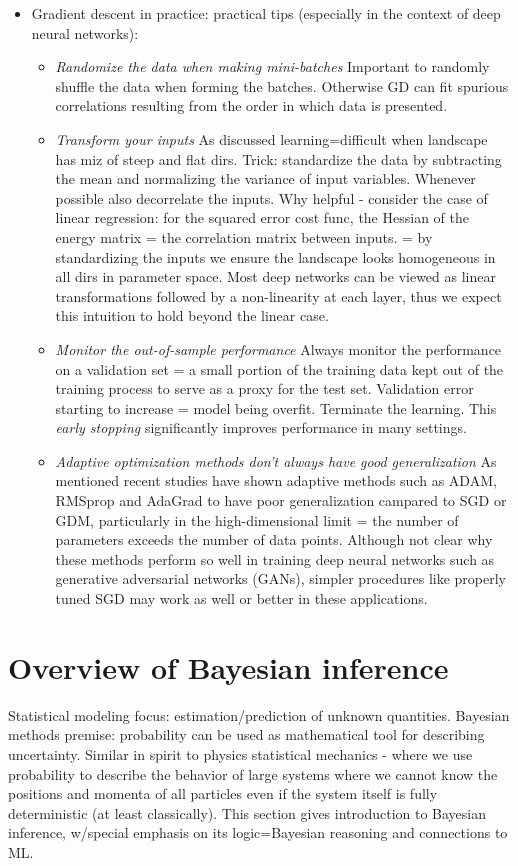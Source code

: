 \documentclass[norsk,a4paper,11pt]{article}
\begin{document}
\begin{itemize}
		\item Gradient descent in practice: practical tips (especially in the context of deep neural networks):
		\begin{itemize}
			\item \textit{Randomize the data when making mini-batches}
			Important to randomly shuffle the data when forming the batches. Otherwise GD can fit spurious correlations resulting from the order in which data is presented.
			\item \textit{Transform your inputs}
			As discussed learning=difficult when landscape has miz of steep and flat dirs. Trick: standardize the data by subtracting the mean and normalizing the variance of input variables. Whenever possible also decorrelate the inputs. Why helpful - consider the case of linear regression: for the squared error cost func, the Hessian of the energy matrix = the correlation matrix between inputs. = by standardizing the inputs we ensure the landscape looks homogeneous in all dirs in parameter space. Most deep networks can be viewed as linear transformations followed by a non-linearity at each layer, thus we expect this intuition to hold beyond the linear case.
			\item \textit{Monitor the out-of-sample performance}
			Always monitor the performance on a validation set = a small portion of the training data kept out of the training process to serve as a proxy for the test set. Validation error starting to increase = model being overfit. Terminate the learning. This \textit{early stopping} significantly improves performance in many settings.
			\item \textit{Adaptive optimization methods don't always have good generalization}
			As mentioned recent studies have shown adaptive methods such as ADAM, RMSprop and AdaGrad to have poor generalization campared to SGD or GDM, particularly in the high-dimensional limit = the number of parameters exceeds the number of data points. Although not clear why these methods perform so well in training deep neural networks such as generative adversarial networks (GANs), simpler procedures like properly tuned SGD may work as well or better in these applications.
		\end{itemize}

	\end{itemize}

\section{Overview of Bayesian inference}
Statistical modeling focus: estimation/prediction of unknown quantities. Bayesian methods premise: probability can be used as mathematical tool for describing uncertainty. 
Similar in spirit to physics statistical mechanics - where we use probability to describe the behavior of large systems where we cannot know the positions and momenta of all particles even if the system itself is fully deterministic (at least classically).
This section gives introduction to Bayesian inference, w/special emphasis on its logic=Bayesian reasoning and connections to ML.
\end{document}
